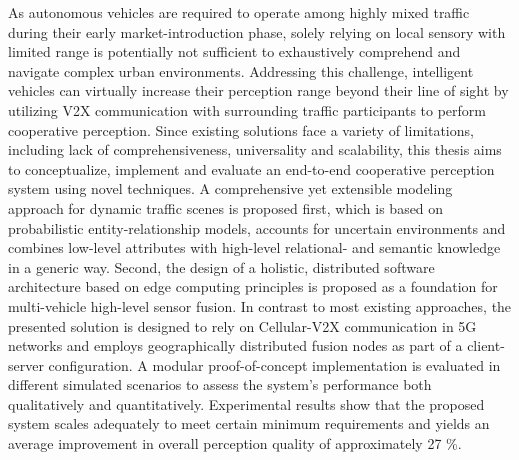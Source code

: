 As autonomous vehicles are required to operate among highly mixed traffic during their early market-introduction phase, solely relying on local sensory with limited range is potentially not sufficient to exhaustively comprehend and navigate complex urban environments. Addressing this challenge, intelligent vehicles can virtually increase their perception range beyond their line of sight by utilizing V2X communication with surrounding traffic participants to perform cooperative perception. Since existing solutions face a variety of limitations, including lack of comprehensiveness, universality and scalability, this thesis aims to conceptualize, implement and evaluate an end-to-end cooperative perception system using novel techniques. A comprehensive yet extensible modeling approach for dynamic traffic scenes is proposed first, which is based on probabilistic entity-relationship models, accounts for uncertain environments and combines low-level attributes with high-level relational- and semantic knowledge in a generic way. Second, the design of a holistic, distributed software architecture based on edge computing principles is proposed as a foundation for multi-vehicle high-level sensor fusion. In contrast to most existing approaches, the presented solution is designed to rely on Cellular-V2X communication in 5G networks and employs geographically distributed fusion nodes as part of a client-server configuration. A modular proof-of-concept implementation is evaluated in different simulated scenarios to assess the system's performance both qualitatively and quantitatively. Experimental results show that the proposed system scales adequately to meet certain minimum requirements and yields an average improvement in overall perception quality of approximately 27 \%.